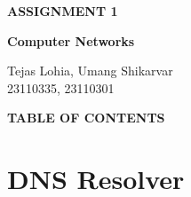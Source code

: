 \documentclass[12pt, a4paper]{report}
\begin{document}
\begin{titlepage}
    \centering
    \vspace*{\fill} %
    
    {\color{customOrange}\Huge\bfseries ASSIGNMENT 1}
    
    \vspace{0.75cm} %
    
    {\Large\bfseries Computer Networks}
    
    \vfill %
    
    \colorbox{customOrange}{%
        \parbox{1.0\textwidth}{%
            \centering
            \vspace{1em} %
            {\Large\color{white} Tejas Lohia, Umang Shikarvar} \\[0.5em] %
            {\large\color{white} 23110335, 23110301} %
            \vspace{1em} %
        }
    }
    
    \vspace*{\fill} %
\end{titlepage}




\renewcommand{\cfttoctitlefont}{\hfill} 
\renewcommand{\cftaftertoctitle}{\hfill}
{\noindent\colorbox{customOrange}{\parbox{\textwidth}{\vspace{0.4em}\Large\bfseries\color{white}\hspace{1em}TABLE OF CONTENTS\vspace{0.4em}}}}

\tableofcontents 

\chapter{DNS Resolver}
\end{document}
